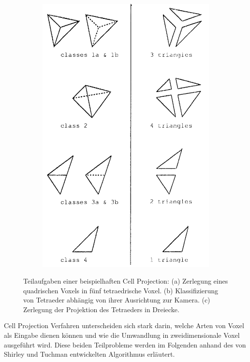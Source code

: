 \documentclass[a4paper,fontsize=12pt,toc=bib,halfparskip]{scrartcl}
\begin{document}
\begin{figure}
\begin{subfigure}{0.3\textwidth}
		\subcaption{}
		\label{Classes}
	\end{subfigure}
	\begin{subfigure}{0.3\textwidth}
		\centering
		\includegraphics[width=\textwidth]{pictures/Triangle.png}
		\subcaption{}
		\label{Triangle}
	\end{subfigure}
	\caption{Teilaufgaben einer beispielhaften Cell Projection: (a) Zerlegung eines quadrischen Voxels in f\"unf tetraedrische Voxel. (b) Klassifizierung von Tetraeder abh\"angig von ihrer Ausrichtung zur Kamera. (c) Zerlegung der Projektion des Tetraeders in Dreiecke.}
\end{figure}

Cell Projection Verfahren unterscheiden sich stark darin, welche Arten von Voxel als Eingabe dienen k\"onnen und wie die Umwandlung in zweidimensionale Voxel ausgef\"uhrt wird. Diese beiden Teilprobleme werden im Folgenden anhand des von Shirley und Tuchman \cite{shirley1990polygonal} entwickelten Algorithmus erl\"autert.
\end{document}
